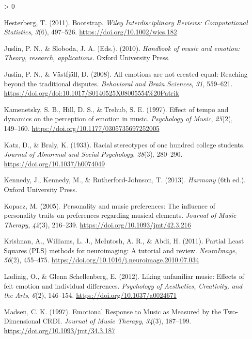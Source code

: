 \documentclass[
  english,
  man,floatsintext]{apa6}
\newlength{\cslhangindent}
\newenvironment{CSLReferences}[2] %
 {%
  \setlength{\parindent}{0pt}
  \ifodd #1 \everypar{\setlength{\hangindent}{\cslhangindent}}\ignorespaces\fi
  \ifnum #2 > 0
  \setlength{\parskip}{#2\baselineskip}
  \fi
 }%
 {}
\begin{document}
\begin{CSLReferences}{1}{0}
\leavevmode\hypertarget{ref-Hesterberg2011}{}%
Hesterberg, T. (2011). {Bootstrap}. \emph{Wiley Interdisciplinary Reviews: Computational Statistics}, \emph{3}(6), 497--526. \url{https://doi.org/10.1002/wics.182}

\leavevmode\hypertarget{ref-Juslin2010}{}%
Juslin, P. N., \& Sloboda, J. A. (Eds.). (2010). \emph{{Handbook of music and emotion: Theory, research, applications.}} Oxford University Press.

\leavevmode\hypertarget{ref-Juslin2008a}{}%
Juslin, P. N., \& Västfjäll, D. (2008). {All emotions are not created equal: Reaching beyond the traditional disputes}. \emph{Behavioral and Brain Sciences}, \emph{31}, 559--621. \url{https://doi.org/doi:10.1017/S0140525X08005554\%20Patrik}

\leavevmode\hypertarget{ref-Kamenetsky1997}{}%
Kamenetsky, S. B., Hill, D. S., \& Trehub, S. E. (1997). {Effect of tempo and dynamics on the perception of emotion in music}. \emph{Psychology of Music}, \emph{25}(2), 149--160. \url{https://doi.org/10.1177/0305735697252005}

\leavevmode\hypertarget{ref-Katz1933}{}%
Katz, D., \& Braly, K. (1933). {Racial stereotypes of one hundred college students}. \emph{Journal of Abnormal and Social Psychology}, \emph{28}(3), 280--290. \url{https://doi.org/10.1037/h0074049}

\leavevmode\hypertarget{ref-Kennedy2013}{}%
Kennedy, J., Kennedy, M., \& Rutherford-Johnson, T. (2013). \emph{Harmony} (6th ed.). Oxford University Press.

\leavevmode\hypertarget{ref-Kopacz2005}{}%
Kopacz, M. (2005). {Personality and music preferences: The influence of personality traits on preferences regarding musical elements}. \emph{Journal of Music Therapy}, \emph{42}(3), 216--239. \url{https://doi.org/10.1093/jmt/42.3.216}

\leavevmode\hypertarget{ref-Krishnan2011}{}%
Krishnan, A., Williams, L. J., McIntosh, A. R., \& Abdi, H. (2011). {Partial Least Squares (PLS) methods for neuroimaging: A tutorial and review}. \emph{NeuroImage}, \emph{56}(2), 455--475. \url{https://doi.org/10.1016/j.neuroimage.2010.07.034}

\leavevmode\hypertarget{ref-Ladinig2012}{}%
Ladinig, O., \& Glenn Schellenberg, E. (2012). {Liking unfamiliar music: Effects of felt emotion and individual differences}. \emph{Psychology of Aesthetics, Creativity, and the Arts}, \emph{6}(2), 146--154. \url{https://doi.org/10.1037/a0024671}

\leavevmode\hypertarget{ref-Madsen1997}{}%
Madsen, C. K. (1997). {Emotional Response to Music as Measured by the Two-Dimensional CRDI}. \emph{Journal of Music Therapy}, \emph{34}(3), 187--199. \url{https://doi.org/10.1093/jmt/34.3.187}


\end{CSLReferences}
\end{document}
